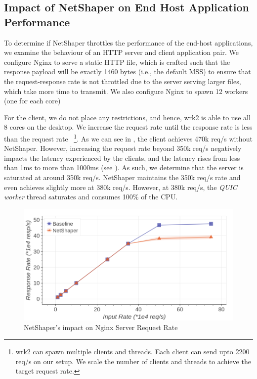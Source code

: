 \subsection{Impact of NetShaper on End Host Application Performance}
\label{subsec:netshaper-evaluation-http-reqs}

To determine if NetShaper throttles the performance of the end-host applications, we examine the behaviour of an HTTP server and client application pair.
We configure Nginx to serve a static HTTP file, which is crafted such that the response payload will be exactly 1460 bytes (i.e., the default MSS) to ensure that the request-response rate is not throttled due to the server serving larger files, which take more time to transmit.
We also configure Nginx to spawn 12 workers (one for each core)

For the client, we do not place any restrictions, and hence, wrk2 is able to use all 8 cores on the desktop.
We increase the request rate until the response rate is less than the request rate~
\footnote{wrk2 can spawn multiple clients and threads. Each client can send upto 2200 req/s on our setup. We scale the number of clients and threads to achieve the target request rate.}.
As we can see in , the client achieves 470k req/s without NetShaper.
However, increasing the request rate beyond 350k req/s negatively impacts the latency experienced by the clients, and the latency rises from less than 1ms to more than 1000ms (see ).
As such, we determine that the server is saturated at around 350k req/s.
NetShaper maintains the 350k req/s rate and even achieves slightly more at 380k req/s.
However, at 380k req/s, the \textit{QUIC worker} thread saturates and consumes 100\% of the CPU.


\begin{figure}[!htb]
    \centering
    \includegraphics[width=0.8\columnwidth]{figures/netshaper/evaluation/http_reqs.png}
    \caption{NetShaper's impact on Nginx Server Request Rate}
    \label{fig:netshaper-eval-http-reqs}
\end{figure}

